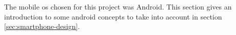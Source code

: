 The mobile \gls{os} chosen for this project was Android. This section gives an introduction to some android concepts to take into account in section \ref{sec:smartphone-design}. 
%

